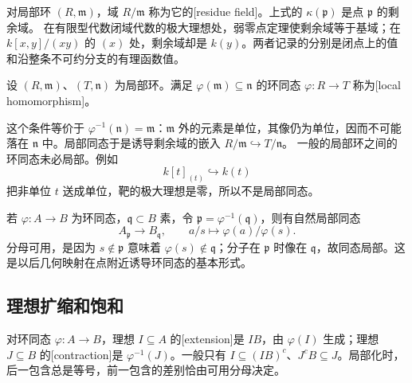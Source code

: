 对局部环 \((R,\mathfrak m)\)，域 \(R/\mathfrak m\) 称为它的[residue field]。上式的 \(\kappa(\mathfrak p)\) 是点 \(\mathfrak p\) 的剩余域。 在有限型代数闭域代数的极大理想处，弱零点定理使剩余域等于基域；在 \(k[x,y]/(xy)\) 的 \((x)\) 处，剩余域却是 \(k(y)\)。两者记录的分别是闭点上的值和沿整条不可约分支的有理函数值。

\begin{definition}\label{g5:def:local-homomorphism}
	设 \((R,\mathfrak m)\)、\((T,\mathfrak n)\) 为局部环。满足 \(\varphi(\mathfrak m)\subseteq\mathfrak n\) 的环同态 \(\varphi:R\to T\) 称为[local homomorphism]。
\end{definition}

这个条件等价于 \(\varphi^{-1}(\mathfrak n)=\mathfrak m\)：\(\mathfrak m\) 外的元素是单位，其像仍为单位，因而不可能落在 \(\mathfrak n\) 中。局部同态于是诱导剩余域的嵌入 \(R/\mathfrak m\hookrightarrow T/\mathfrak n\)。 一般的局部环之间的环同态未必局部。例如
\[
	k[t]_{(t)}\hookrightarrow k(t)
\]
把非单位 \(t\) 送成单位，靶的极大理想是零，所以不是局部同态。

\ProseParagraphBreak

若 \(\varphi:A\to B\) 为环同态，\(\mathfrak q\subset B\) 素，令 \(\mathfrak p=\varphi^{-1}(\mathfrak q)\)，则有自然局部同态
\[
	A_{\mathfrak p}\longrightarrow B_{\mathfrak q},
	\qquad a/s\longmapsto\varphi(a)/\varphi(s).
\]
分母可用，是因为 \(s\notin\mathfrak p\) 意味着 \(\varphi(s)\notin\mathfrak q\)；分子在 \(\mathfrak p\) 时像在 \(\mathfrak q\)，故同态局部。这是以后几何映射在点附近诱导环同态的基本形式。

\subsection{理想扩缩和饱和}
\label{g5:subsec:0201:04}

对环同态 \(\varphi:A\to B\)，理想 \(I\subseteq A\) 的[extension]是 \(IB\)，由 \(\varphi(I)\) 生成；理想 \(J\subseteq B\) 的[contraction]是 \(\varphi^{-1}(J)\)。一般只有 \(I\subseteq(IB)^c\)、\(J^cB\subseteq J\)。局部化时，后一包含总是等号，前一包含的差别恰由可用分母决定。

